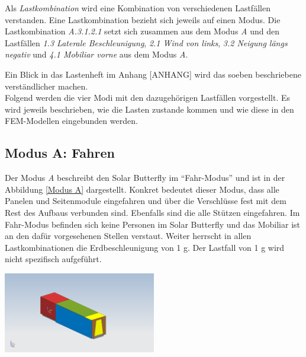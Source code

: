 Als \emph{Lastkombination} wird eine Kombination von verschiedenen Lastfällen verstanden. Eine Lastkombination bezieht sich jeweils auf einen Modus. Die Lastkombination \emph{A.3.1.2.1} setzt sich zusammen aus dem Modus \emph{A} und den Lastfällen \emph{1.3 Laterale Beschleunigung}, \emph{2.1 Wind von links}, \emph{3.2 Neigung längs negativ} und \emph{4.1 Mobiliar vorne} aus dem Modus \emph{A}.

Ein Blick in das Lastenheft im Anhang [ANHANG] wird das soeben beschriebene verständlicher machen.\\

Folgend werden die vier Modi mit den dazugehörigen Lastfällen vorgestellt. Es wird jeweils beschrieben, wie die Lasten zustande kommen und wie diese in den FEM-Modellen eingebunden werden.

\subsection{Modus A: Fahren}
Der Modus \emph{A} beschreibt den Solar Butterfly im ``Fahr-Modus'' und ist in der Abbildung \ref{Modus A} dargestellt. Konkret bedeutet dieser Modus, dass alle Panelen und Seitenmodule eingefahren und über die Verschlüsse fest mit dem Rest des Aufbaus verbunden sind. Ebenfalls sind die alle Stützen eingefahren. Im Fahr-Modus befinden sich keine Personen im Solar Butterfly und das Mobiliar ist an den dafür vorgesehenen Stellen verstaut. Weiter herrscht in allen Lastkombinationen die Erdbeschleunigung von 1 g. Der Lastfall von 1 g wird nicht spezifisch aufgeführt.

\begin{center}
  \includegraphics[width=0.5\textwidth]{04_Figures/A.png}
  \label{Modus A}
\end{center}

